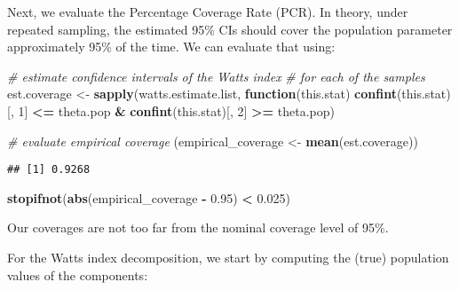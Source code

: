 \documentclass[
]{book}
\newenvironment{Shaded}{\begin{snugshade}}{\end{snugshade}}
\newcommand{\CommentTok}[1]{\textcolor[rgb]{0.56,0.35,0.01}{\textit{#1}}}
\newcommand{\ControlFlowTok}[1]{\textcolor[rgb]{0.13,0.29,0.53}{\textbf{#1}}}
\newcommand{\DecValTok}[1]{\textcolor[rgb]{0.00,0.00,0.81}{#1}}
\newcommand{\FloatTok}[1]{\textcolor[rgb]{0.00,0.00,0.81}{#1}}
\newcommand{\FunctionTok}[1]{\textcolor[rgb]{0.13,0.29,0.53}{\textbf{#1}}}
\newcommand{\NormalTok}[1]{#1}
\newcommand{\OtherTok}[1]{\textcolor[rgb]{0.56,0.35,0.01}{#1}}
\newcommand{\SpecialCharTok}[1]{\textcolor[rgb]{0.81,0.36,0.00}{\textbf{#1}}}
\begin{document}
Next, we evaluate the Percentage Coverage Rate (PCR). In theory, under repeated sampling, the estimated 95\% CIs should cover the population parameter approximately 95\% of the time. We can evaluate that using:

\begin{Shaded}
\begin{Highlighting}[]
\CommentTok{\# estimate confidence intervals of the Watts index}
\CommentTok{\# for each of the samples}
\NormalTok{est.coverage }\OtherTok{\textless{}{-}}
  \FunctionTok{sapply}\NormalTok{(watts.estimate.list, }\ControlFlowTok{function}\NormalTok{(this.stat)}
    \FunctionTok{confint}\NormalTok{(this.stat)[, }\DecValTok{1}\NormalTok{] }\SpecialCharTok{\textless{}=}\NormalTok{ theta.pop }\SpecialCharTok{\&}
      \FunctionTok{confint}\NormalTok{(this.stat)[, }\DecValTok{2}\NormalTok{] }\SpecialCharTok{\textgreater{}=}\NormalTok{ theta.pop)}

\CommentTok{\# evaluate empirical coverage}
\NormalTok{(empirical\_coverage }\OtherTok{\textless{}{-}} \FunctionTok{mean}\NormalTok{(est.coverage))}
\end{Highlighting}
\end{Shaded}

\begin{verbatim}
## [1] 0.9268
\end{verbatim}

\begin{Shaded}
\begin{Highlighting}[]
\FunctionTok{stopifnot}\NormalTok{(}\FunctionTok{abs}\NormalTok{(empirical\_coverage  }\SpecialCharTok{{-}} \FloatTok{0.95}\NormalTok{) }\SpecialCharTok{\textless{}} \FloatTok{0.025}\NormalTok{)}
\end{Highlighting}
\end{Shaded}

Our coverages are not too far from the nominal coverage level of 95\%.

For the Watts index decomposition, we start by computing the (true) population values of the components:
\end{document}
